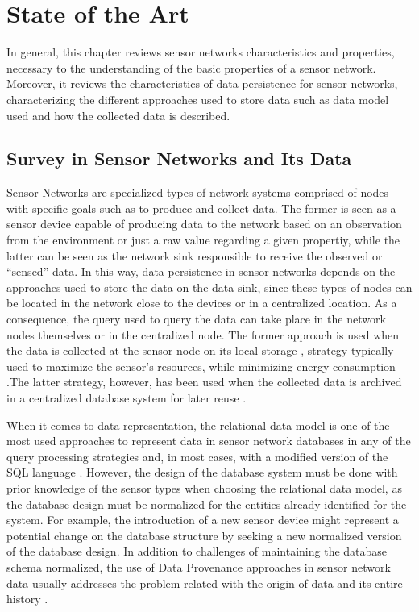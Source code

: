 

\chapter{State of the Art}

In general, this chapter reviews sensor networks characteristics and
properties, necessary to the understanding of the basic properties of a sensor
network. Moreover, it reviews the characteristics of data persistence for
sensor networks, characterizing the different approaches used to store data
such as data model used and how the collected data is described.

\section{Survey in Sensor Networks and Its Data}

Sensor Networks are specialized types of network systems comprised of nodes
with specific goals such as to produce and collect data. The former is seen
as a sensor device capable of producing data to the network based on an
observation from the environment or just a raw value regarding a given
propertiy, while the latter can be seen as the network sink responsible to
receive the observed or ``sensed'' data. In this way, data persistence in sensor
networks depends on the approaches used to store the data on the data sink,
since these types of nodes can be located in the network close to the devices 
or in a centralized location. As a consequence, the query used to query the
data can take place in the network nodes themselves or in the centralized node.
The former approach is used when the data is collected at the sensor node on
its local storage \cite{sn-storage01, sn-storage03}, strategy typically
used to maximize the sensor's resources, while minimizing energy consumption
\cite{sn-storage04}.The latter strategy, however, has been used when the
collected data is archived in a centralized database system for later reuse
\cite{sn-storage02}.

When it comes to data representation, the relational data model
\cite{relational-model} is one of the most used approaches to represent data in
sensor network databases in any of the query processing strategies and, in most
cases, with a modified version of the SQL language \cite{sn-db-newop}. However,
the design of the database system must be done with prior knowledge of the
sensor types when choosing the relational data model, as the database design
must be normalized \cite{db-normalization} for the entities already identified
for the system. For example, the introduction of a new sensor device might
represent a potential change on the database structure by seeking a new
normalized version of the database design. In addition to challenges of
maintaining the database schema normalized, the use of Data Provenance 
approaches in sensor network data usually addresses the problem related with
the origin of data and its entire history \cite{sn-provenance}.

